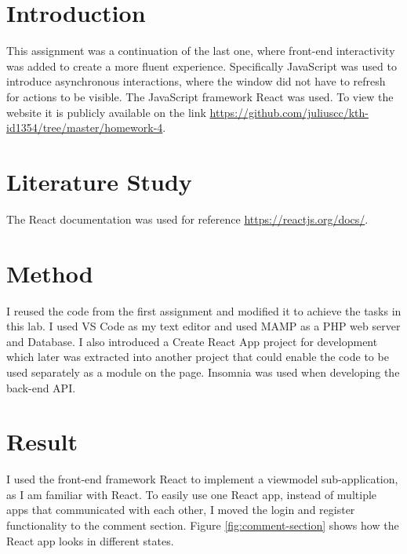 \documentclass[a4paper]{scrartcl}
\begin{document}
\section{Introduction}

This assignment was a continuation of the last one, where front-end interactivity was added to create a more fluent experience. Specifically JavaScript was used to introduce asynchronous interactions, where the window did not have to refresh for actions to be visible. The JavaScript framework React was used. To view the website it is publicly available on the link \href{https://github.com/juliuscc/kth-id1354/tree/master/homework-4}{https://github.com/juliuscc/kth-id1354/tree/master/homework-4}.

\section{Literature Study}

The React documentation was used for reference \href{https://reactjs.org/docs/}{https://reactjs.org/docs/}.

\section{Method}

I reused the code from the first assignment and modified it to achieve the tasks in this lab. I used VS Code as my text editor and used MAMP as a PHP web server and Database. I also introduced a Create React App project for development which later was extracted into another project that could enable the code to be used separately as a module on the page. Insomnia was used when developing the back-end API.

\section{Result}

I used the front-end framework React to implement a viewmodel sub-application, as I am familiar with React. To easily use one React app, instead of multiple apps that communicated with each other, I moved the login and register functionality to the comment section. Figure \ref{fig:comment-section} shows how the React app looks in different states.
\end{document}
